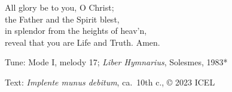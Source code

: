 \hymn



\begin{underhymnverse}
All glory be to you, O Christ;\\
the Father and the Spirit blest,\\
in splendor from the heights of heav’n,\\
reveal that you are Life and Truth. Amen.
\end{underhymnverse}

\begin{hymnsource}
Tune: Mode I, melody 17; \emph{Liber Hymnarius}, Solesmes, 1983*

Text: \emph{Implente munus debitum}, ca.\ 10th c., © 2023 ICEL
\end{hymnsource}
